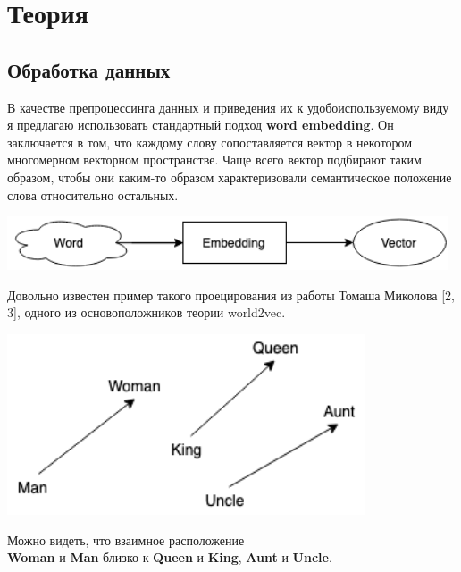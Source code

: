 


\section{Теория}

\subsection{Обработка данных}

В качестве препроцессинга данных и приведения их к удобоиспользуемому виду я предлагаю использовать стандартный подход \textbf{word embedding}. Он заключается в том, что каждому слову сопоставляется вектор в некотором многомерном векторном пространстве. Чаще всего вектор подбирают таким образом, чтобы они каким-то образом характеризовали семантическое положение слова относительно остальных.

\begin{center} \includegraphics[width=370pt]{images/model_schema_1.png}\end{center}

Довольно известен пример такого проецирования из работы Томаша Миколова [2, 3], одного из основоположников теории world2vec.

\begin{center} \includegraphics[width=300pt]{images/model_schema_2.png}

Можно видеть, что взаимное расположение\\ \textbf{Woman} и \textbf{Man} близко к \textbf{Queen} и \textbf{King}, \textbf{Aunt} и \textbf{Uncle}.\end{center}

